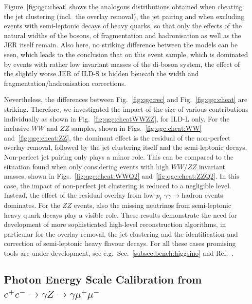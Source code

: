 Figure~\ref{fig:qgc:cheat} shows the analogous distributions obtained when cheating the jet clustering (incl.\ the overlay removal), the jet pairing and when excluding events with semi-leptonic decays of heavy quarks, so that only the effects of the natural widths of the bosons, of fragmentation and hadronisation as well as the JER itself remain. Also here, no striking difference between the models can be seen, which leads to the conclusion that on this event sample, which is dominated by events with rather low invariant masses of the di-boson system, the effect of the slightly worse JER of ILD-S is hidden beneath the width and fragmentation/hadronisation corrections.


Nevertheless, the differences between Fig.~\ref{fig:qgc:rec} and Fig.~\ref{fig:qgc:cheat} are striking. Therefore, we investigated the impact of the size of various contributions individually as shown in Fig.~\ref{fig:qgc:cheatWWZZ}, for ILD-L only. For the inclusive $WW$ and $ZZ$ samples, shown in Figs.~\ref{fig:qgc:cheat:WW} and~\ref{fig:qgc:cheat:ZZ}, the dominant effect is the residual of the non-perfect overlay removal, followed by the jet clustering itself and the semi-leptonic decays. Non-perfect jet pairing only plays a minor role. This can be compared to the situation found when only considering events with high $WW$/$ZZ$ invariant masses, shown in Figs.~\ref{fig:qgc:cheat:WWQ2} and~\ref{fig:qgc:cheat:ZZQ2}. In this case, the impact of non-perfect jet clustering is reduced to a negligible level. Instead, the effect of the residual overlay from low-$p_t$ $\gamma \gamma \to $hadron events dominates. For the $ZZ$ events, also the missing neutrinos from semi-leptonic heavy quark decays play a visible role. 
These results demonstrate the need for development of more sophisticated high-level reconstruction algorithms, in particular for the overlay removal, the jet clustering and the identification and correction of semi-leptonic heavy flavour decays. For all these cases promising tools are under development, see e.g.\ Sec.~\ref{subsec:bench:higgsino} and Ref.~\cite{Boronat:2014hva}.

\subsection{Photon Energy Scale Calibration from \texorpdfstring{$e^+e^- \to \gamma Z \to \gamma \mu^+\mu^-$}{e+e- -> aZ -> mumu}}
\label{subsec:bench:gammaZ}

